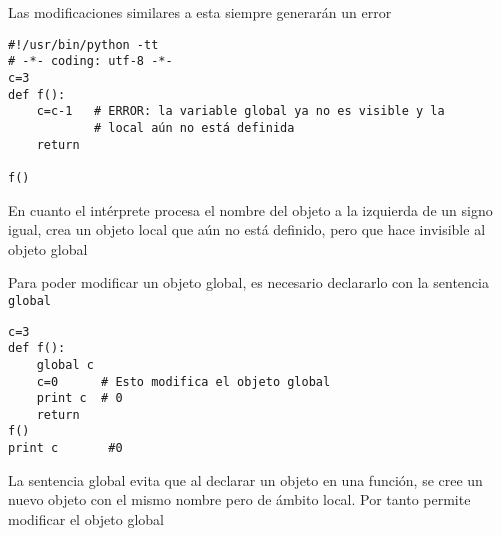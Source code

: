\documentclass[ucs]{beamer}
\begin{document}
\begin{frame}[fragile]
Las modificaciones similares a esta siempre generarán un error

  \begin{scriptsize}
\begin{verbatim}
#!/usr/bin/python -tt
# -*- coding: utf-8 -*-
c=3
def f():
    c=c-1   # ERROR: la variable global ya no es visible y la
            # local aún no está definida
    return
    
f()
\end{verbatim}
  \end{scriptsize}

En cuanto el intérprete procesa
el nombre del objeto a la izquierda de un signo igual, crea
un objeto local que aún no está definido, pero que hace
invisible al objeto global
\end{frame}





\begin{frame}[fragile]

Para poder modificar un objeto global, es necesario
declararlo con la 
 sentencia \verb|global|

  \begin{scriptsize}
\begin{verbatim}
c=3
def f():
    global c
    c=0      # Esto modifica el objeto global
    print c  # 0
    return
f()
print c       #0

\end{verbatim}
  \end{scriptsize}

La sentencia global evita que al declarar un objeto en una función,
se cree un nuevo objeto con el mismo nombre pero de ámbito local.
Por tanto permite modificar el objeto global

\end{frame}
\end{document}
